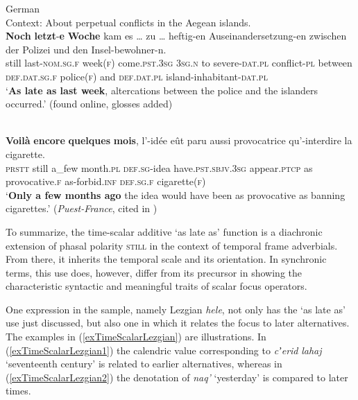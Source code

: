 \enlargethispage{\baselineskip}
\begin{exe}
	\ex German\label{extimeScalarPFVGerman}\\
	Context: About perpetual conflicts in the Aegean islands.\\
	\gll \textbf{Noch} \textbf{letzt}-\textbf{e} \textbf{Woche} kam es … zu … heftig-en Auseinandersetzung-en zwischen der Polizei und den Insel-bewohner-n.\\
	still last-\textsc{nom}.\textsc{sg}.\textsc{f} week(\textsc{f}) come.\textsc{pst}.3\textsc{sg} 3\textsc{sg}.\textsc{n} {} to {} severe-\textsc{dat}.\textsc{pl} conflict-\textsc{pl} between \textsc{def}.\textsc{dat}.\textsc{sg}.\textsc{f} police(\textsc{f}) and \textsc{def}.\textsc{dat}.\textsc{pl} island-inhabitant-\textsc{dat}.\textsc{pl}\\
	\glt \lq \textbf{As late as last week}, altercations between the police and the islanders occurred.\rq{ }(found online, glosses added)%
 
	\ex {}\label{exTimeScalarFrenchVoila} \\
	 \gll \textbf{Voilà} \textbf{encore} \textbf{quelques} \textbf{mois}, l'-idée eût paru aussi provocatrice qu’-interdire la cigarette.\\
	\textsc{prstt} still a\_few month.\textsc{pl} \textsc{def}.\textsc{sg}-idea have.\textsc{pst}.\textsc{sbjv}.3\textsc{sg} appear.\textsc{ptcp} as provocative.\textsc{f} as-forbid.\textsc{inf} \textsc{def}.\textsc{sg}.\textsc{f} cigarette(\textsc{f})\\
	\glt \lq \textbf{Only a few months ago} the idea would have been as provocative as banning cigarettes.' (\textit{Puest-France}, cited in \cite[258]{Fuchs1993})	
\end{exe}	

To summarize, the time-scalar additive \lq as late as' function is a diachronic extension of phasal polarity \textsc{still} in the context of temporal frame adverbials. From there, it inherits the temporal scale and its orientation. In synchronic terms, this use does, however, differ from its precursor in showing the characteristic syntactic and meaningful traits of scalar focus operators.

One expression in the sample, namely Lezgian \textit{hele}, not only has the \lq as late as\rq{ }use just discussed, but also one in which it relates the focus to later alternatives. The examples in (\ref{exTimeScalarLezgian}) are illustrations. In (\ref{exTimeScalarLezgian1}) the calendric value corresponding to \textit{cʼerid} \textit{lahaj} \lq seventeenth century\rq{ }is related to earlier alternatives, whereas in (\ref{exTimeScalarLezgian2}) the denotation of \textit{naq'} \lq yesterday\rq{ }is compared to later times.\pagebreak

